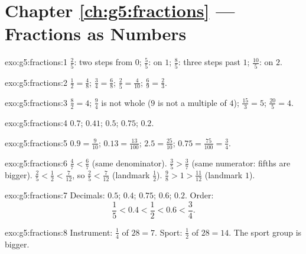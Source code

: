 \section*{Chapter \ref{ch:g5:fractions} --- Fractions as Numbers}

\begin{solution}{exo:g5:fractions:1}
$\frac25$: two steps from $0$; $\frac55$: on $1$; $\frac85$: three
steps past $1$; $\frac{10}{5}$: on $2$.
\end{solution}

\begin{solution}{exo:g5:fractions:2}
$\frac12 = \frac48$; \quad $\frac34 = \frac68$; \quad
$\frac25 = \frac{4}{10}$; \quad $\frac69 = \frac23$.
\end{solution}

\begin{solution}{exo:g5:fractions:3}
$\frac82 = 4$; \quad $\frac94$ is not whole ($9$ is not a multiple
of $4$); \quad $\frac{15}{3} = 5$; \quad $\frac{20}{5} = 4$.
\end{solution}

\begin{solution}{exo:g5:fractions:4}
$0.7$; \quad $0.41$; \quad $0.5$; \quad $0.75$; \quad $0.2$.
\end{solution}

\begin{solution}{exo:g5:fractions:5}
$0.9 = \frac{9}{10}$; \quad $0.13 = \frac{13}{100}$; \quad
$2.5 = \frac{25}{10}$; \quad $0.75 = \frac{75}{100} = \frac34$.
\end{solution}

\begin{solution}{exo:g5:fractions:6}
$\frac47 < \frac67$ (same denominator). \quad
$\frac35 > \frac37$ (same numerator: fifths are bigger). \quad
$\frac25 < \frac12 < \frac{7}{12}$, so $\frac25 < \frac{7}{12}$
(landmark $\frac12$). \quad
$\frac98 > 1 > \frac{11}{12}$ (landmark $1$).
\end{solution}

\begin{solution}{exo:g5:fractions:7}
Decimals: $0.5$; $0.4$; $0.75$; $0.6$; $0.2$. Order:
\[
\frac15 < 0.4 < \frac12 < 0.6 < \frac34 .
\]
\end{solution}

\begin{solution}{exo:g5:fractions:8}
Instrument: $\frac14$ of $28 = 7$. Sport: $\frac12$ of $28 = 14$.
The sport group is bigger.
\end{solution}

